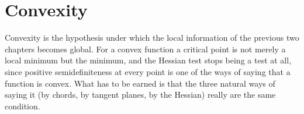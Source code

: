 \chapter{Convexity}
\label{ch:convexity}

Convexity is the hypothesis under which the local information of the previous two chapters
becomes global. For a convex function a critical point is not merely a local minimum but the
minimum, and the Hessian test stops being a test at all, since positive semidefiniteness at every
point is one of the ways of saying that a function is convex. What has to be earned is that the
three natural ways of saying it (by chords, by tangent planes, by the Hessian) really are the
same condition.



